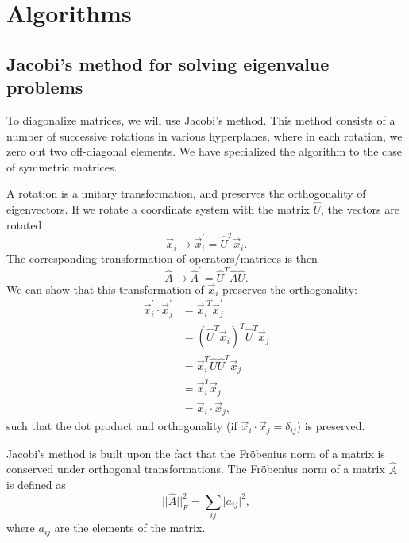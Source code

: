 \documentclass[%
 reprint,
nofootinbib,
aps,
]{revtex4-1}
\begin{document}
\section{Algorithms}

\subsection{Jacobi's method for solving eigenvalue problems}

To diagonalize matrices, we will use Jacobi's method. This method consists of a number of successive rotations in various hyperplanes, where in each rotation, we zero out two off-diagonal elements. We have specialized the algorithm to the case of symmetric matrices.

A rotation is a unitary transformation, and preserves the orthogonality of eigenvectors. If we rotate a coordinate system with the matrix $\hat{U}$, the vectors are rotated
\begin{equation}
\vec{x}_i \rightarrow \vec{x}_i^\prime = \hat{U}^T\vec{x}_i.
\end{equation}
The corresponding transformation of operators/matrices is then
\begin{equation}
\hat{A} \rightarrow \hat{A}^\prime = \hat{U}^T\hat{A}\hat{U}.
\end{equation}
We can show that this transformation of $\vec{x}_i$ preserves the orthogonality:
\begin{align}
\vec{x}_i^\prime\cdot\vec{x}_j^\prime &= \vec{x}_i^{\prime T}\vec{x}_j^\prime\\
&= (\hat{U}^T\vec{x}_i)^T\hat{U}^T\vec{x}_j\\
&= \vec{x}_i^T\hat{U}\hat{U}^T\vec{x}_j\\
&= \vec{x}_i^T\vec{x}_j\\
&= \vec{x}_i\cdot \vec{x}_j,
\end{align}
such that the dot product and orthogonality (if $\vec{x}_i\cdot \vec{x}_j = \delta_{ij}$) is preserved.

Jacobi's method is built upon the fact that the Fröbenius norm of a matrix is conserved under orthogonal transformations\cite{hjorten}. The Fröbenius norm of a matrix $\hat{A}$ is defined as
\begin{equation}
\lvert\lvert\hat{A}\rvert\rvert_F^2 = \sum_{ij} \lvert a_{ij}\rvert ^2,
\end{equation}
where $a_{ij}$ are the elements of the matrix.
\end{document}
